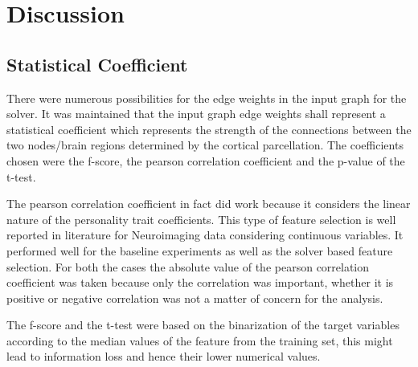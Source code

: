 \documentclass[msthesis.tex]{subfiles}
\begin{document}
\chapter{Discussion}
\section{Statistical Coefficient}
There were numerous possibilities for the edge weights in the input graph for the solver. It was maintained that the input graph edge weights shall represent a statistical coefficient which represents the strength of the connections between the two nodes/brain regions determined by the cortical parcellation. The coefficients chosen were the f-score, the pearson correlation coefficient and the p-value of the t-test. 


The pearson correlation coefficient in fact did work because it considers the linear nature of the personality trait coefficients. This type of feature selection is well reported in literature for Neuroimaging data considering continuous variables. It performed well for the baseline experiments as well as the solver based feature selection. For both the cases the absolute value of the pearson correlation coefficient was taken because only the correlation was important, whether it is positive or negative correlation was not a matter of concern for the analysis.

The f-score and the t-test were based on the binarization of the target variables according to the median values of the feature from the training set, this might lead to information loss and hence their lower numerical values. 
\end{document}
